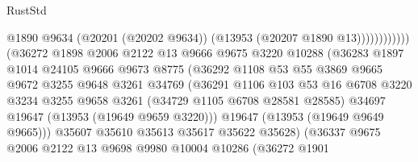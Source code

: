 \begin{lexlean}{RustStd}
\begin{coremodule}
                                              @1890
                                              @9634
                                              (@20201 (@20202 @9634))
                                              (@13953 (@20207 @1890 @13))))))))))))
                          (@36272
                            @1898
                            @2006
                            @2122
                            @13
                            @9666
                            @9675
                            @3220
                            @10288
                            (@36283
                              @1897
                              @1014
                              @24105
                              @9666
                              @9673
                              @8775
                              (@36292
                                @1108
                                @53
                                @55
                                @3869
                                @9665
                                @9672
                                @3255
                                @9648
                                @3261
                                @34769
                                (@36291
                                  @1106
                                  @103
                                  @53
                                  @16
                                  @6708
                                  @3220
                                  @3234
                                  @3255
                                  @9658
                                  @3261
                                  (@34729 @1105 @6708 @28581 @28585)
                                  @34697
                                  @19647
                                  (@13953 (@19649 @9659 @3220)))
                                @19647
                                (@13953 (@19649 @9649 @9665)))
                              @35607
                              @35610
                              @35613
                              @35617
                              @35622
                              @35628)
                            (@36337
                              @9675
                              @2006
                              @2122
                              @13
                              @9698
                              @9980
                              @10004
                              @10286
                              (@36272
                                @1901

\end{coremodule}
\end{lexlean}
